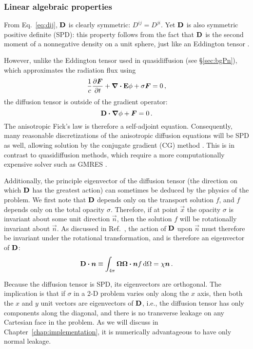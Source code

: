 \subsubsection{Linear algebraic properties}\label{sec:adLinalg}
From Eq.~\eqref{eq:dij}, $\mathbf{D}$ is clearly symmetric: $D^{ij}=D^{ji}$. Yet
$\mathbf{D}$ is also symmetric positive definite (SPD): this property follows from
the fact that $\mathbf{D}$ is the second moment of a nonnegative density on a unit
sphere, just like an Eddington tensor \cite{Lev1984}.

However, unlike the Eddington tensor used in quasidiffusion (see
\S\ref{sec:bgPn}), which approximates the radiation flux using
\begin{equation*}
  \frac{1}{c} \frac{\partial \bm{F}}{\partial t} + \bm{\nabla} \bm{\cdot} \mathbf{E} \phi + \sigma \bm{F} = 0\,,
\end{equation*}
the diffusion tensor is outside of the gradient operator:
\begin{equation*}
  \mathbf{D} \bm{\cdot} \bm{\nabla} \phi + \bm{F} = 0\,.
\end{equation*}
The anisotropic Fick's law is therefore a self-adjoint equation.  Consequently,
many
reasonable discretizations of the anisotropic diffusion equations will be SPD as
well, allowing solution by the conjugate gradient (CG) method \cite{Tre1997}.
This is in contrast to quasidiffusion methods, which
require a more computationally expensive solver such as GMRES \cite{War2003}.

Additionally, the principle eigenvector of the diffusion tensor (the direction
on which $\mathbf{D}$ has the greatest action) can sometimes be deduced by
the physics of the problem. We first note that $\mathbf{D}$ depends only on the
transport solution $f$, and $f$ depends only on the total opacity $\sigma$.
Therefore, if at point $\vec{x}$ the opacity $\sigma$ is invariant about some
unit direction $\vec{n}$, then the solution $f$ will be rotationally invariant
about $\vec{n}$. As discussed in Ref.~\cite{Lev1984}, the action of $\mathbf{D}$ upon
$\vec{n}$ must therefore be invariant under the rotational transformation, and
is therefore an eigenvector of $\mathbf{D}$:
\begin{equation*}
  \mathbf{D} \bm{\cdot} \bm{n}
  \equiv \int_{4\pi} \bm{\Omega} \bm{\Omega} \bm{\cdot} \bm{n} f \mathop{}\!\mathrm{d} \Omega
  = \chi \bm{n} \,.
\end{equation*}

Because the diffusion tensor is SPD, its eigenvectors are orthogonal. The
implication is that if $\sigma$ in a 2-D problem varies only along
the $x$ axis, then both the $x$ and $y$ unit vectors are
eigenvectors of $\mathbf{D}$, i.e., the diffusion tensor has only
components along the diagonal, and there is no transverse leakage on any
Cartesian face in the problem. As we will discuss in
Chapter~\ref{chap:implementation}, it is numerically advantageous to have only
normal leakage.

